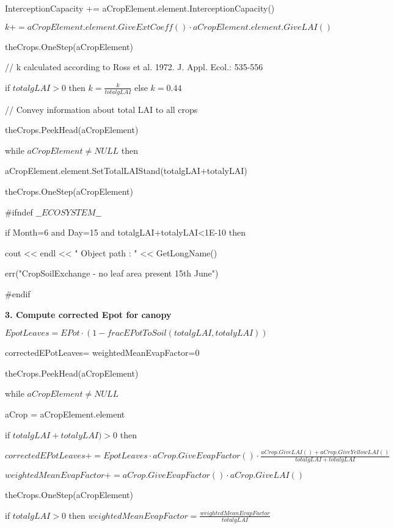 \documentclass[%
]{scrartcl}
\begin{document}
\quad InterceptionCapacity += aCropElement.element.InterceptionCapacity()
     
 \quad $k                    += aCropElement.element.GiveExtCoeff() \cdot aCropElement.element.GiveLAI()$
      
theCrops.OneStep(aCropElement)
   
   
// k calculated according to Ross et al. 1972. J. Appl. Ecol.: 535-556

if $totalgLAI>0$ then
     $k=\tfrac{k}{totalgLAI}  $
   else
  $k=0.44$
  
 // Convey information about total LAI to all crops
  
 theCrops.PeekHead(aCropElement)
  
 while $aCropElement\ne NULL$ then
   
   
\quad     aCropElement.element.SetTotalLAIStand(totalgLAI+totalyLAI)
   
\quad     theCrops.OneStep(aCropElement)
   

\#ifndef $\_\_ECOSYSTEM\_\_$
  
 if Month=6  and  Day=15  and  totalgLAI+totalyLAI<1E-10 then
   
  \quad      cout << endl << " Object path : " << GetLongName()

  \quad      err("CropSoilExchange - no leaf area present 15th June")
   
\#endif

   \textbf{3. Compute corrected Epot for canopy}

     $EpotLeaves = EPot \cdot (1-fracEPotToSoil(totalgLAI,totalyLAI))$
    
 correctedEPotLeaves= weightedMeanEvapFactor=0
   
theCrops.PeekHead(aCropElement)
  
 while $aCropElement\ne NULL$
  
 \quad    
 aCrop = aCropElement.element
    
  \quad if $totalgLAI+totalyLAI)>0$ then
      
  \quad  \quad $ correctedEPotLeaves += 
EpotLeaves \cdot aCrop.GiveEvapFactor() \cdot \tfrac{aCrop.GiveLAI()
+aCrop.GiveYellowLAI()}{totalgLAI+totalyLAI}$
     
 \quad $weightedMeanEvapFactor += aCrop.GiveEvapFactor() \cdot aCrop.GiveLAI()$
     
 \quad theCrops.OneStep(aCropElement)
  
  
 if $totalgLAI>0$ then     
   $weightedMeanEvapFactor=\tfrac{weightedMeanEvapFactor}{totalgLAI}$
\end{document}
